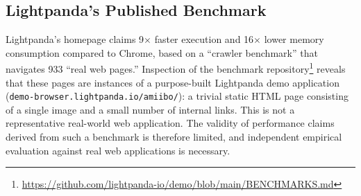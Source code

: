 \subsection{Lightpanda's Published Benchmark}

Lightpanda's homepage claims 9$\times$ faster execution and 16$\times$ lower memory consumption compared to Chrome, based on a ``crawler benchmark'' that navigates 933 ``real web pages.'' Inspection of the benchmark repository\footnote{\url{https://github.com/lightpanda-io/demo/blob/main/BENCHMARKS.md}} reveals that these pages are instances of a purpose-built Lightpanda demo application (\texttt{demo-browser.lightpanda.io/amiibo/}): a trivial static HTML page consisting of a single image and a small number of internal links. This is not a representative real-world web application. The validity of performance claims derived from such a benchmark is therefore limited, and independent empirical evaluation against real web applications is necessary.
